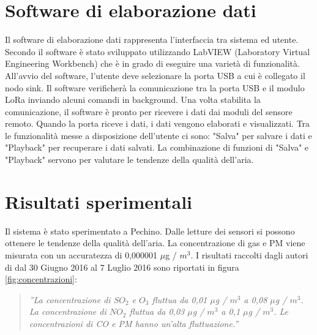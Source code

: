 \documentclass[a4paper]{report} %
\begin{document}
\section{Software di elaborazione dati}
Il software di elaborazione dati rappresenta l'interfaccia tra sistema ed utente. Secondo \cite{art:rif.40} il software è stato sviluppato utilizzando LabVIEW (Laboratory Virtual Engineering Workbench) che è in grado di eseguire una varietà di funzionalità. All'avvio del software, l'utente deve selezionare la porta USB a cui è collegato il nodo sink. Il software verificherà la comunicazione tra la porta USB e il modulo LoRa inviando alcuni comandi in background. Una volta stabilita la comunicazione, il software è pronto per ricevere i dati dai moduli del sensore remoto. Quando la porta riceve i dati, i dati vengono elaborati e visualizzati. Tra le funzionalità messe a disposizione dell'utente ci sono: "Salva" per salvare i dati e "Playback" per recuperare i dati salvati. La combinazione di funzioni di "Salva" e "Playback" servono per valutare le tendenze della qualità dell'aria. 

\section{Risultati sperimentali}
Il sistema è stato sperimentato a Pechino. Dalle letture dei sensori si possono ottenere le tendenze della qualità dell'aria. La concentrazione di gas e PM viene misurata con un accuratezza di 0,000001 $\mu$g / $ m^3 $. I risultati raccolti dagli autori di \cite{art:rif.40} dal 30 Giugno 2016 al 7 Luglio 2016 sono riportati in figura \ref{fig:concentrazioni}:
\begin{quote}
	\textit{''La concentrazione di $ SO_{2} $ e $ O_{3} $ fluttua da 0,01 $\mu$g / $ m^3 $ a 0,08 $\mu$g / $m^3$. La concentrazione di $ NO_{2} $ fluttua da 0,03 $\mu$g / $m^3$ a 0,1 $\mu$g / $m^3$. Le concentrazioni di CO e PM hanno un'alta fluttuazione.''}
\end{quote}  
\end{document}
